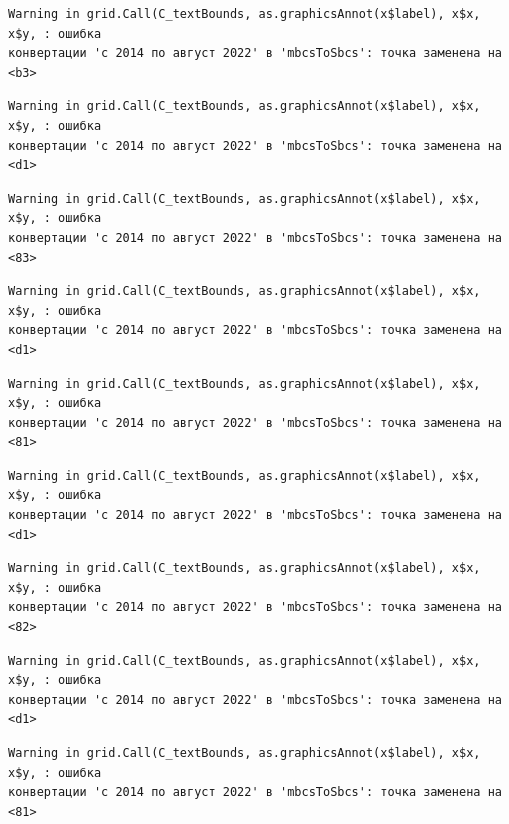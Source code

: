 \documentclass[
  letterpaper,
  DIV=11,
  numbers=noendperiod]{scrreprt}
\begin{document}
\begin{verbatim}
Warning in grid.Call(C_textBounds, as.graphicsAnnot(x$label), x$x, x$y, : ошибка
конвертации 'с 2014 по август 2022' в 'mbcsToSbcs': точка заменена на <b3>
\end{verbatim}

\begin{verbatim}
Warning in grid.Call(C_textBounds, as.graphicsAnnot(x$label), x$x, x$y, : ошибка
конвертации 'с 2014 по август 2022' в 'mbcsToSbcs': точка заменена на <d1>
\end{verbatim}

\begin{verbatim}
Warning in grid.Call(C_textBounds, as.graphicsAnnot(x$label), x$x, x$y, : ошибка
конвертации 'с 2014 по август 2022' в 'mbcsToSbcs': точка заменена на <83>
\end{verbatim}

\begin{verbatim}
Warning in grid.Call(C_textBounds, as.graphicsAnnot(x$label), x$x, x$y, : ошибка
конвертации 'с 2014 по август 2022' в 'mbcsToSbcs': точка заменена на <d1>
\end{verbatim}

\begin{verbatim}
Warning in grid.Call(C_textBounds, as.graphicsAnnot(x$label), x$x, x$y, : ошибка
конвертации 'с 2014 по август 2022' в 'mbcsToSbcs': точка заменена на <81>
\end{verbatim}

\begin{verbatim}
Warning in grid.Call(C_textBounds, as.graphicsAnnot(x$label), x$x, x$y, : ошибка
конвертации 'с 2014 по август 2022' в 'mbcsToSbcs': точка заменена на <d1>
\end{verbatim}

\begin{verbatim}
Warning in grid.Call(C_textBounds, as.graphicsAnnot(x$label), x$x, x$y, : ошибка
конвертации 'с 2014 по август 2022' в 'mbcsToSbcs': точка заменена на <82>
\end{verbatim}

\begin{verbatim}
Warning in grid.Call(C_textBounds, as.graphicsAnnot(x$label), x$x, x$y, : ошибка
конвертации 'с 2014 по август 2022' в 'mbcsToSbcs': точка заменена на <d1>
\end{verbatim}

\begin{verbatim}
Warning in grid.Call(C_textBounds, as.graphicsAnnot(x$label), x$x, x$y, : ошибка
конвертации 'с 2014 по август 2022' в 'mbcsToSbcs': точка заменена на <81>
\end{verbatim}
\end{document}
